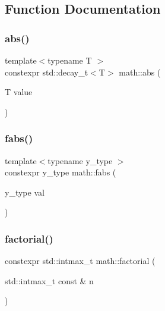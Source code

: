\subsection{Function Documentation}
\mbox{\label{namespacemath_a49650a9f506dd5208d963d74ab9b9370}} 
\subsubsection{\texorpdfstring{abs()}{abs()}}
{\footnotesize\ttfamily template$<$typename T $>$ \\
constexpr std\+::decay\+\_\+t$<$T$>$ math\+::abs (\begin{DoxyParamCaption}\item[{T}]{value }\end{DoxyParamCaption})\hspace{0.3cm}{\ttfamily [inline]}}

\mbox{\label{namespacemath_a4ed3724aa337c68adee88563238c6845}} 
\subsubsection{\texorpdfstring{fabs()}{fabs()}}
{\footnotesize\ttfamily template$<$typename y\+\_\+type $>$ \\
constexpr y\+\_\+type math\+::fabs (\begin{DoxyParamCaption}\item[{y\+\_\+type}]{val }\end{DoxyParamCaption})}

\mbox{\label{namespacemath_a7606ea45ee84c24d1a0e661bec3879f1}} 
\subsubsection{\texorpdfstring{factorial()}{factorial()}}
{\footnotesize\ttfamily constexpr std\+::intmax\+\_\+t math\+::factorial (\begin{DoxyParamCaption}\item[{std\+::intmax\+\_\+t const \&}]{n }\end{DoxyParamCaption})}

\mbox{\label{namespacemath_ad1f27e28f460fb7a1393d9c0518c2e53}} 
